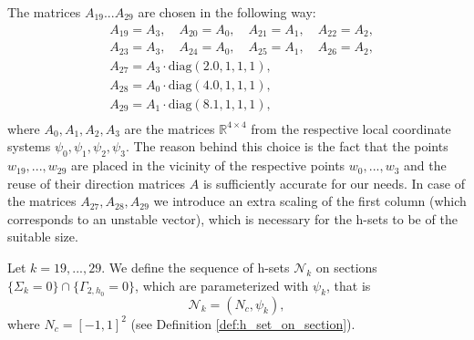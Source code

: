 \documentclass[1p]{article}
\begin{document}
The matrices $A_{19}... A_{29}$ are chosen in the following way:
\begin{equation}
    \label{eq:A_19_29}
    \begin{split}
        &A_{19} = A_3, \quad A_{20} = A_0, \quad A_{21} = A_1, \quad A_{22} = A_2, \\
        &A_{23} = A_3, \quad A_{24} = A_0, \quad A_{25} = A_1, \quad A_{26} = A_2, \\
        &A_{27} = A_3 \cdot \textrm{diag}(2.0, 1, 1, 1), \\
        &A_{28} = A_0 \cdot \textrm{diag}(4.0, 1, 1, 1), \\
        &A_{29} = A_1 \cdot \textrm{diag}(8.1, 1, 1, 1), \\
    \end{split}
\end{equation}
where $A_0, A_1, A_2, A_3$ are the matrices $\mathbb{R}^{4 \times 4}$ from the respective local coordinate systems $\psi_0, \psi_1, \psi_2, \psi_3$. The reason behind this choice is the fact that the points $w_{19}, ..., w_{29}$ are placed in the vicinity of the respective points $w_0, ..., w_3$ and the reuse of their direction matrices $A$ is sufficiently accurate for our needs. In case of the matrices $A_{27}, A_{28}, A_{29}$ we introduce an extra scaling of the first column (which corresponds to an unstable vector), which is necessary for the h-sets to be of the suitable size.

Let $k = 19, ..., 29$. We define the sequence of h-sets $\mathcal{N}_k$ on sections $\{ \Sigma_k = 0 \} \cap \{ \Gamma_{2,h_0} = 0 \}$, which are parameterized with $\psi_k$, that is
\[
    \mathcal{N}_k = (N_c, \psi_k),
\]
where $N_c = [-1,1]^2$ (see Definition \ref{def:h_set_on_section}).
\end{document}
